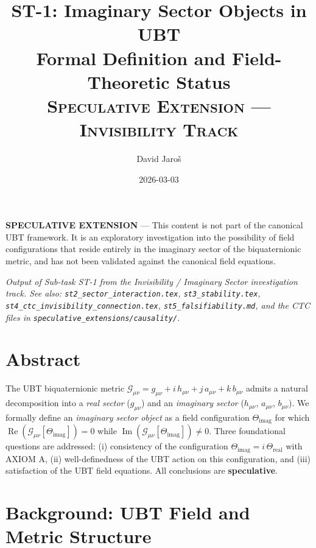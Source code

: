 \documentclass[12pt]{article}
\title{ST-1: Imaginary Sector Objects in UBT\\
Formal Definition and Field-Theoretic Status\\[0.5em]
\large\textsc{Speculative Extension — Invisibility Track}}
\author{David Jaroš}
\date{2026-03-03}
\begin{document}
\maketitle

\begin{tcolorbox}[colback=yellow!10, title=Status]
\textbf{SPECULATIVE EXTENSION} — This content is not part of
the canonical UBT framework.  It is an exploratory investigation
into the possibility of field configurations that reside entirely
in the imaginary sector of the biquaternionic metric, and has not
been validated against the canonical field equations.
\end{tcolorbox}

\vspace{1em}
\noindent\textit{Output of Sub-task ST-1 from the Invisibility / Imaginary Sector
investigation track.  See also:
\texttt{st2\_sector\_interaction.tex},
\texttt{st3\_stability.tex},
\texttt{st4\_ctc\_invisibility\_connection.tex},
\texttt{st5\_falsifiability.md},
and the CTC files in \texttt{speculative\_extensions/causality/}.}

\section*{Abstract}
The UBT biquaternionic metric $\mathcal{G}_{\mu\nu} = g_{\mu\nu}
+ i\,h_{\mu\nu} + j\,a_{\mu\nu} + k\,b_{\mu\nu}$ admits
a natural decomposition into a \emph{real sector} ($g_{\mu\nu}$)
and an \emph{imaginary sector} ($h_{\mu\nu}$, $a_{\mu\nu}$,
$b_{\mu\nu}$).  We formally define an \emph{imaginary sector object}
as a field configuration $\Theta_\mathrm{imag}$ for which
$\operatorname{Re}(\mathcal{G}_{\mu\nu}[\Theta_\mathrm{imag}]) = 0$
while $\operatorname{Im}(\mathcal{G}_{\mu\nu}[\Theta_\mathrm{imag}]) \neq 0$.
Three foundational questions are addressed: (i) consistency of
the configuration $\Theta_\mathrm{imag} = i\,\Theta_\mathrm{real}$
with AXIOM A, (ii) well-definedness of the UBT action on this
configuration, and (iii) satisfaction of the UBT field equations.
All conclusions are \textbf{speculative}.

\section{Background: UBT Field and Metric Structure}
\end{document}
